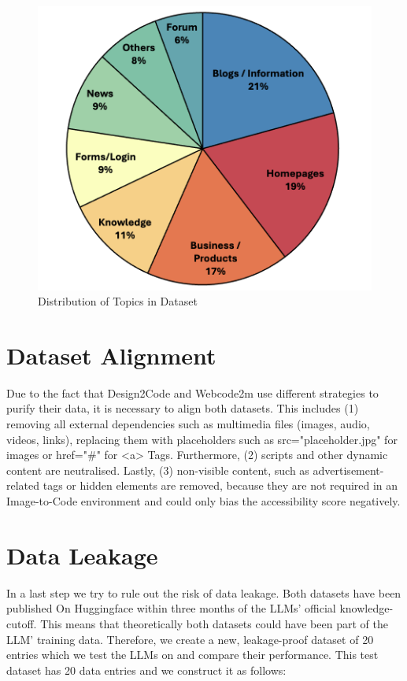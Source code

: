 \begin{figure}[p]
  \centering
  \includegraphics[width=\textwidth]{figures/dataset_distribution.png}
  \caption{Distribution of Topics in Dataset}
  \label{fig:dataset_distribution}
\end{figure}

\section{Dataset Alignment}
Due to the fact that Design2Code and Webcode2m use different strategies to purify
their data, it is necessary to align both datasets.
This includes (1) removing all external dependencies such as multimedia files (images, 
audio, videos, links), replacing them with placeholders such as src="placeholder.jpg" 
for images or href="\#" for <a> Tags. Furthermore, (2) scripts and other dynamic 
content are neutralised.
Lastly, (3) non-visible content, such as advertisement-related tags or hidden elements 
are removed, because they are not required in an Image-to-Code environment and 
could only bias the accessibility score negatively.


\section{Data Leakage}
In a last step we try to rule out the risk of data leakage. Both datasets have been
published On Huggingface within three months of the LLMs' official knowledge-cutoff.
This means that theoretically both datasets could have been part of the LLM' training
data.
Therefore, we create a 
new, leakage-proof dataset of 20 entries which we test the LLMs on and compare their 
performance.
This test dataset has 20 data entries and we construct it as follows:

